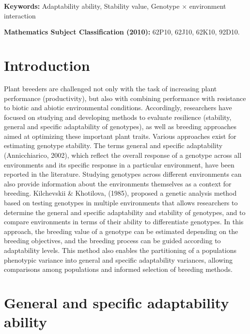 \documentclass[
]{article}
\begin{document}
\textbf{Keywords:} Adaptability ability, Stability value, Genotype ×
environment interaction

\textbf{Mathematics Subject Classification (2010):} 62P10, 62J10, 62K10,
92D10.

\hypertarget{introduction}{%
\section{Introduction}\label{introduction}}

Plant breeders are challenged not only with the task of increasing plant
performance (productivity), but also with combining performance with
resistance to biotic and abiotic environmental conditions. Accordingly,
researchers have focused on studying and developing methods to evaluate
resilience (stability, general and specific adaptability of genotypes),
as well as breeding approaches aimed at optimizing these important plant
traits. Various approaches exist for estimating genotype stability. The
terms general and specific adaptability (Annicchiarico, 2002), which
reflect the overall response of a genotype across all environments and
its specific response in a particular environment, have been reported in
the literature. Studying genotypes across different environments can
also provide information about the environments themselves as a context
for breeding. Kilchevskii \& Khotilova, (1985), proposed a genetic
analysis method based on testing genotypes in multiple environments that
allows researchers to determine the general and specific adaptability
and stability of genotypes, and to compare environments in terms of
their ability to differentiate genotypes. In this approach, the breeding
value of a genotype can be estimated depending on the breeding
objectives, and the breeding process can be guided according to
adaptability levels. This method also enables the partitioning of a
population\textquotesingle s phenotypic variance into general and
specific adaptability variances, allowing comparisons among populations
and informed selection of breeding methods.

\hypertarget{general-and-specific-adaptability-ability}{%
\section{General and specific adaptability
ability}\label{general-and-specific-adaptability-ability}}
\end{document}
